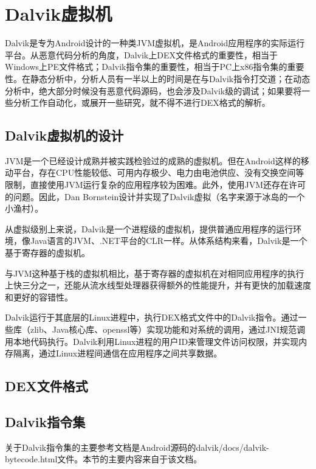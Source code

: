 \chapter{Dalvik虚拟机}
\label{Chap:dalvik}
Dalvik是专为Android设计的一种类JVM虚拟机，是Android应用程序的实际运行平台。从恶意代码分析的角度，Dalvik上DEX文件格式的重要性，相当于Windows上PE文件格式；Dalvik指令集的重要性，相当于PC上x86指令集的重要性。在静态分析中，分析人员有一半以上的时间是在与Dalvik指令打交道；在动态分析中，绝大部分时候没有恶意代码源码，也会涉及Dalvik级的调试；如果要将一些分析工作自动化，或展开一些研究，就不得不进行DEX格式的解析。

\section{Dalvik虚拟机的设计}
JVM是一个已经设计成熟并被实践检验过的成熟的虚拟机。但在Android这样的移动平台，存在CPU性能较低、可用内存极少、电力由电池供应、没有交换空间等限制，直接使用JVM运行复杂的应用程序较为困难。此外，使用JVM还存在许可的问题。因此，Dan Bornstein设计并实现了Dalvik虚拟（名字来源于冰岛的一个小渔村）。

从虚拟级别上来说，Dalvik是一个进程级的虚拟机，提供普通应用程序的运行环境，像Java语言的JVM、.NET平台的CLR一样。从体系结构来看，Dalvik是一个基于寄存器的虚拟机。

与JVM这种基于栈的虚拟机相比，基于寄存器的虚拟机在对相同应用程序的执行上快三分之一，还能从流水线型处理器获得额外的性能提升，并有更快的加载速度和更好的容错性\cite{dalvik_analysis}。

Dalvik运行于其底层的Linux进程中，执行DEX格式文件中的Dalvik指令。通过一些库（zlib、Java核心库、openssl等）实现功能和对系统的调用，通过JNI规范调用本地代码执行。Dalvik利用Linux进程的用户ID来管理文件访问权限，并实现内存隔离，通过Linux进程间通信在应用程序之间共享数据。
\section{DEX文件格式}
\section{Dalvik指令集}
关于Dalvik指令集的主要参考文档是Android源码的dalvik/docs/dalvik-bytecode.html文件。本节的主要内容来自于该文档。

